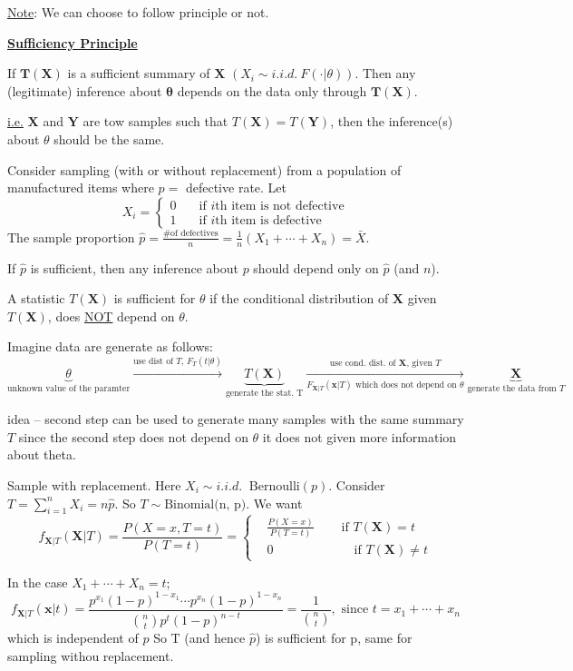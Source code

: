 \documentclass[english, 11pt]{article}
\begin{document}
\underline{Note}: We can choose to follow principle or not.


\underline{\textbf{Sufficiency Principle}}

If $\bm{T}(\bm{X})$ is a sufficient summary of $\bm{X}$ $(X_i\sim i.i.d. ~F(\cdot|\theta))$. Then any (legitimate) inference about $\bm{\theta}$ depends on the data only through $\bm{T}(\bm{X})$.

\underline{i.e.} $\bm{X}$ and $\bm{Y}$ are tow samples such that $T(\bm{X})=T(\bm{Y})$,  then the inference(s) about $\theta$ should be the same.

\begin{exmp}[Inspection]\label{exmp:inspction}
Consider sampling (with or without replacement) from a population of manufactured items where $p=$ defective rate. Let
$$
X_i=\left\{\begin{aligned}0&\quad \text{if $i$th item is not defective}\\
1&\quad \text{if $i$th item is defective}\end{aligned}\right.
$$
The sample  proportion $\hat{p}=\frac{\text{\# of defectives}}{n}=\frac{1}{n}(X_1+\cdots+X_n)=\bar{X}$.

If $\hat{p}$ is sufficient, then any inference about $p$ should depend only on $\hat{p}$ (and $n$).
\end{exmp}


\begin{defn}
A statistic $T(\bm{X})$ is sufficient for $\theta$ if the conditional distribution of $\bm{X}$ given $T(\bm{X})$, does \underline{NOT} depend on $\theta$.
\end{defn}

Imagine data are generate as follows:
$$
\underbrace{\theta}_{\text{unknown value of the paramter}}\xrightarrow[]{\text{use dist of $T$, $F_T(t|\theta)$}}\underbrace{T(\bm{X})}_{\text{generate the stat. T}}\xrightarrow[F_{\bm{X}|T}(\bm{x}|T) \text{ which does not depend on $\theta$}]{\text{use cond. dist. of $\bm{X}$, given $T$}}\underbrace{\bm{X}}_{\text{generate the data from $T$}}
$$


idea -- second step can be used to generate many samples with the same summary $T$ since the second step does not depend on $\theta$ it does not given more information about theta.


\begin{exmp}
Sample with replacement. Here $X_i\sim i.i.d.~ \text{ Bernoulli}(p)$. Consider $T=\sum_{i=1}^nX_i=n\hat{p}$. So $T\sim \text{Binomial(n, p)}$. We want
$$
f_{\bm{X}|T}(\bm{X}|T)=\frac{P(X=x, T=t)}{P(T=t)}=\left\{\begin{aligned}
&\frac{P(X=x)}{P(T=t)}&\quad \text{ if } T(\bm{X})=t\\
&0&\qquad \text{ if } T(\bm{X})\not=t
\end{aligned}\right.
$$

In the case $X_1+\cdots+X_n=t$;
$$
f_{\bm{X}|T}(\bm{x}|t)=\frac{p^{x_1}(1-p)^{1-x_1}\cdots p^{x_n}(1-p)^{1-x_n}}{\binom{n}{t}p^t(1-p)^{n-t}}=\frac{1}{\binom{n}{t}}, \text{ since } t=x_1+\cdots+x_n
$$
which is independent of $p$
So T (and hence $\hat{p}$) is sufficient for p, same for sampling withou replacement.
\end{exmp}
\end{document}
